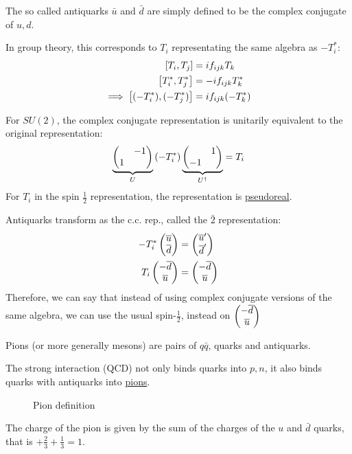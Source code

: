 \begin{definition}[Antiquarks]
  The so called antiquarks $\bar{u}$ and $\bar{d}$ are simply defined to be the complex conjugate of $u,d$.

  In group theory, this corresponds to $T_i$ representating the same algebra as $-T_i^*$:
  \begin{align*}
    \comm{T_i}{T_j}&=if_{ijk}T_k\\
    \comm{T_i^*}{T_j^*}&=-if_{ijk}T_k^*\\
    \implies\comm{(-T_i^*)}{(-T_j^*)}&=if_{ijk}(-T_k^*)
  \end{align*}
\end{definition}

For $SU(2)$, the complex conjugate representation is unitarily equivalent to the original representation:
\begin{align*}
  \underbrace{\pmqty{&-1\\1}}_{U}\qty(-T_i^*)
  \underbrace{\pmqty{&1\\-1}}_{U^\dag}=T_i
\end{align*}
For $T_i$ in the spin $\frac12$ representation, the representation is \underline{pseudoreal}.

Antiquarks transform as the c.c. rep., called the $\bar{2}$ representation:
\begin{align*}
  -T_i^*\pmqty{\bar{u}\\\bar{d}}&=\pmqty{\bar{u}'\\\bar{d}'}\\
  T_i\pmqty{-\bar{d}\\\bar{u}}&=\pmqty{-\bar{d}\\\bar{u}}
\end{align*}
Therefore, we can say that instead of using complex conjugate versions of the same algebra, we can use the usual spin-$\frac12$, instead on $\pmqty{-\bar{d}\\\bar{u}}$
\begin{definition}[Pions]
  Pions (or more generally mesons) are pairs of $q\bar{q}$, quarks and antiquarks.
\end{definition}
The strong interaction (QCD) not only binds quarks into $p,n$, it also binds quarks with antiquarks into \underline{pions}.

\begin{figure}[H]
  \centering
  
  \caption{Pion definition}
  \label{fig:pion}
\end{figure}
The charge of the pion is given by the sum of the charges of the $u$ and $\bar{d}$ quarks, that is $+\frac23+\frac13=1$.

